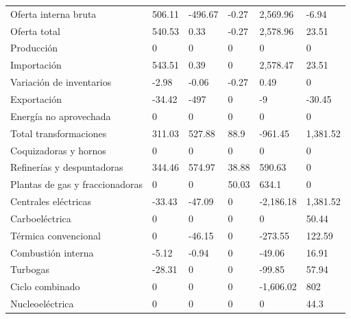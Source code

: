 \documentclass{sener2025}
\begin{document}
\begin{tabladoradoLargo}
\begin{xltabular}{\textwidth}{YZZZZZ}
    Oferta interna bruta & 506.11 & -496.67 & -0.27 & 2,569.96 & -6.94 \\
    \hspace{1.35em} Oferta total & 540.53 & 0.33 & -0.27 & 2,578.96 & 23.51 \\
    \hspace{2.7em} Producción & 0 & 0 & 0 & 0 & 0 \\
    \hspace{2.7em} Importación & 543.51 & 0.39 & 0 & 2,578.47 & 23.51 \\
    \hspace{2.7em} Variación de inventarios & -2.98 & -0.06 & -0.27 & 0.49 & 0 \\
    \hspace{1.35em} Exportación & -34.42 & -497 & 0 & -9 & -30.45 \\
    \hspace{1.35em} Energía no aprovechada & 0 & 0 & 0 & 0 & 0 \\
    Total transformaciones & 311.03 & 527.88 & 88.9 & -961.45 & 1,381.52 \\
    \hspace{1.35em} Coquizadoras y hornos & 0 & 0 & 0 & 0 & 0 \\
    \hspace{1.35em} Refinerías y despuntadoras & 344.46 & 574.97 & 38.88 & 590.63 & 0 \\
    \hspace{1.35em} Plantas de gas y fraccionadoras & 0 & 0 & 50.03 & 634.1 & 0 \\
    \hspace{1.35em} Centrales eléctricas & -33.43 & -47.09 & 0 & -2,186.18 & 1,381.52 \\
    \hspace{2.7em} Carboeléctrica & 0 & 0 & 0 & 0 & 50.44 \\
    \hspace{2.7em} Térmica convencional & 0 & -46.15 & 0 & -273.55 & 122.59 \\
    \hspace{2.7em} Combustión interna & -5.12 & -0.94 & 0 & -49.06 & 16.91 \\
    \hspace{2.7em} Turbogas & -28.31 & 0 & 0 & -99.85 & 57.94 \\
    \hspace{2.7em} Ciclo combinado & 0 & 0 & 0 & -1,606.02 & 802 \\
    \hspace{2.7em} Nucleoeléctrica & 0 & 0 & 0 & 0 & 44.3 \\

\end{xltabular}
\end{tabladoradoLargo}
\end{document}
